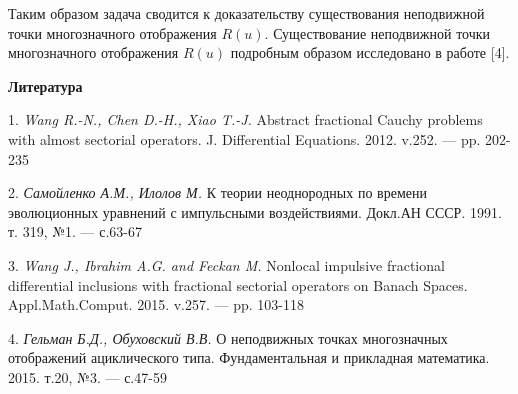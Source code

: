 Таким образом задача сводится к доказательству существования неподвижной точки многозначного отображения $R(u)$. Существование неподвижной точки многозначного отображения $R(u)$ подробным образом исследовано в работе [4].










\smallskip \centerline {\bf Литература} \nopagebreak

1. {\it Wang R.-N., Chen D.-H., Xiao T.-J.} Abstract fractional Cauchy problems with almost sectorial operators. J. Differential Equations. 2012. v.252. — pp. 202-235

2. {\it Самойленко А.М., Илолов М.} К теории неоднородных по времени эволюционных уравнений с импульсными воздействиями. Докл.АН СССР. 1991. т. 319, №1. — с.63-67

3. {\it Wang J., Ibrahim A.G. and Feckan M.} Nonlocal impulsive fractional differential inclusions with fractional sectorial operators on Banach Spaces. Appl.Math.Comput. 2015. v.257. — pp. 103-118

4. {\it Гельман Б.Д., Обуховский В.В.} О неподвижных точках многозначных отображений ациклического типа. Фундаментальная и прикладная математика. 2015. т.20, №3. — с.47-59
